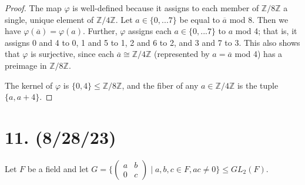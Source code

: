 \documentclass{article}
\begin{document}
\begin{proof}
    The map $\varphi$ is well-defined because it assigns to each member of $\mathbb{Z}/8\mathbb{Z}$ a single, unique element of $\mathbb{Z}/4\mathbb{Z}$. Let $a \in \{ 0, ... 7 \}$ be equal to $\overline{a}$ mod 8. Then we have $\varphi(\overline{a}) = \varphi(a)$. Further, $\varphi$ assigns each $a \in \{ 0, ... 7 \}$ to $a$ mod 4; that is, it assigns 0 and 4 to 0, 1 and 5 to 1, 2 and 6 to 2, and 3 and 7 to 3. This also shows that $\varphi$ is surjective, since each $\overline{a} \cong \mathbb{Z}/4\mathbb{Z}$ (represented by $a = \overline{a}$ mod 4) has a preimage in $\mathbb{Z}/8\mathbb{Z}$.

    The kernel of $\varphi$ is $\{ 0, 4 \} \leq \mathbb{Z}/8\mathbb{Z}$, and the fiber of any $a \in \mathbb{Z}/4\mathbb{Z}$ is the tuple $\{ a, a + 4 \}$.
\end{proof}

\section*{11. (8/28/23)}

Let $F$ be a field and let $G = \{ \begin{pmatrix}a & b \\ 0 & c\end{pmatrix} \mid a, b, c \in F, ac \neq 0 \} \leq GL_2(F)$.
\end{document}
